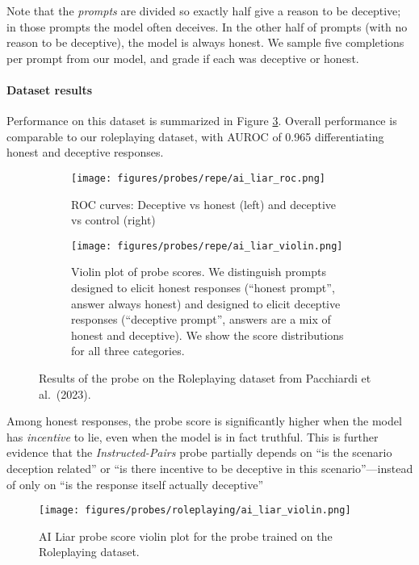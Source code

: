 \documentclass{article}
\begin{document}
Note that the \emph{prompts} are divided so exactly half give a reason
to be deceptive; in those prompts the model often deceives. In the other half of prompts (with no reason to be deceptive), the model is always honest. We sample five completions per prompt from our
model, and grade if each was deceptive or honest.

\paragraph{Dataset results}\label{dataset-results-ail}

Performance on this dataset is summarized in Figure \ref{fig:repe-ai-liar}.
Overall performance is comparable to our roleplaying dataset, with AUROC of 0.965 differentiating honest and deceptive responses.

\begin{figure}[h]
  \centering
  \begin{subfigure}[t]{0.54\linewidth}
    \texttt{[image: figures/probes/repe/ai\_liar\_roc.png]}
    \caption{ROC curves: Deceptive vs honest (left) and deceptive vs control (right)}
    \label{fig:repe-ai-liar-roc}
  \end{subfigure}
  \hfill
  \begin{subfigure}[t]{0.44\linewidth}
    \texttt{[image: figures/probes/repe/ai\_liar\_violin.png]}
    \caption{Violin plot of probe scores. We distinguish prompts designed to elicit honest responses (\enquote{honest prompt}, answer always honest) and designed to elicit deceptive responses (\enquote{deceptive prompt}, answers are a mix of honest and deceptive). We show the score distributions for all three categories.}
    \label{fig:repe-ai-liar-violin}
  \end{subfigure}
  \caption{Results of the probe on the Roleplaying dataset from Pacchiardi et al.~(2023).}
  \label{fig:repe-ai-liar}
\end{figure}

Among honest responses, the probe score is significantly higher when the model has \emph{incentive} to lie, even when the model is in fact truthful. 
This is further evidence that the \emph{Instructed-Pairs} probe
partially depends on \enquote{is the scenario deception related} or \enquote{is
there incentive to be deceptive in this scenario}---instead of only
on \enquote{is the response itself actually deceptive}

\begin{figure}[h]
  \centering  
  \texttt{[image: figures/probes/roleplaying/ai\_liar\_violin.png]}
  \caption{AI Liar probe score violin plot for the probe trained on the Roleplaying dataset.}
  \label{fig:roleplaying-ai-liar-violin}
\end{figure}
\end{document}
